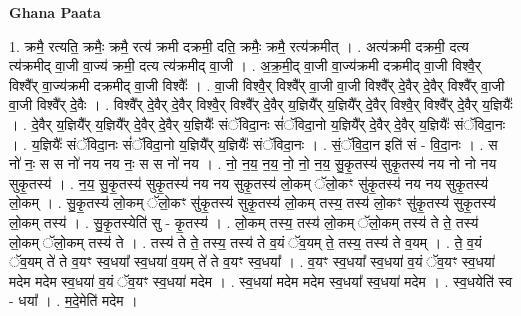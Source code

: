 \documentclass[17pt]{extarticle}
\begin{document}
\textbf{Ghana Paata } \newline

1. क्रमै॒ रत्यति॒ क्रमैः॒ क्रमै॒ रत्य॑ क्रमी दक्रमी॒ दति॒ क्रमैः॒ क्रमै॒ रत्य॑क्रमीत् । . अत्य॑क्रमी दक्रमी॒ दत्य त्य॑क्रमीद् वा॒जी वा॒ज्य॑ क्रमी॒ दत्य त्य॑क्रमीद् वा॒जी । . अ॒क्र॒मी॒द् वा॒जी वा॒ज्य॑क्रमी दक्रमीद् वा॒जी विश्वै॒र् विश्वै᳚र् वा॒ज्य॑क्रमी दक्रमीद् वा॒जी विश्वैः᳚ । . वा॒जी विश्वै॒र् विश्वै᳚र् वा॒जी वा॒जी विश्वै᳚र् दे॒वैर् दे॒वैर् विश्वै᳚र् वा॒जी वा॒जी विश्वै᳚र् दे॒वैः । . विश्वै᳚र् दे॒वैर् दे॒वैर् विश्वै॒र् विश्वै᳚र् दे॒वैर् य॒ज्ञियै᳚र् य॒ज्ञियै᳚र् दे॒वैर् विश्वै॒र् विश्वै᳚र् दे॒वैर् य॒ज्ञियैः᳚ । . दे॒वैर् य॒ज्ञियै᳚र् य॒ज्ञियै᳚र् दे॒वैर् दे॒वैर् य॒ज्ञियैः᳚ संॅविदा॒नः सं॑ॅविदा॒नो य॒ज्ञियै᳚र् दे॒वैर् दे॒वैर् य॒ज्ञियैः᳚ संॅविदा॒नः । . य॒ज्ञियैः᳚ संॅविदा॒नः सं॑ॅविदा॒नो य॒ज्ञियै᳚र् य॒ज्ञियैः᳚ संॅविदा॒नः । . सं॒ॅवि॒दा॒न इति॑ सं - वि॒दा॒नः । . स नो॑ नः॒ स स नो॑ नय नय नः॒ स स नो॑ नय । . नो॒ न॒य॒ न॒य॒ नो॒ नो॒ न॒य॒ सु॒कृ॒तस्य॑ सुकृ॒तस्य॑ नय नो नो नय सुकृ॒तस्य॑ । . न॒य॒ सु॒कृ॒तस्य॑ सुकृ॒तस्य॑ नय नय सुकृ॒तस्य॑ लो॒कम् ॅलो॒कꣳ सु॑कृ॒तस्य॑ नय नय सुकृ॒तस्य॑ लो॒कम् । . सु॒कृ॒तस्य॑ लो॒कम् ॅलो॒कꣳ सु॑कृ॒तस्य॑ सुकृ॒तस्य॑ लो॒कम् तस्य॒ तस्य॑ लो॒कꣳ सु॑कृ॒तस्य॑ सुकृ॒तस्य॑ लो॒कम् तस्य॑ । . सु॒कृ॒तस्येति॑ सु - कृ॒तस्य॑ । . लो॒कम् तस्य॒ तस्य॑ लो॒कम् ॅलो॒कम् तस्य॑ ते ते॒ तस्य॑ लो॒कम् ॅलो॒कम् तस्य॑ ते । . तस्य॑ ते ते॒ तस्य॒ तस्य॑ ते व॒यं ॅव॒यम् ते॒ तस्य॒ तस्य॑ ते व॒यम् । . ते॒ व॒यं ॅव॒यम् ते॑ ते व॒यꣳ स्व॒धया᳚ स्व॒धया॑ व॒यम् ते॑ ते व॒यꣳ स्व॒धया᳚ । . व॒यꣳ स्व॒धया᳚ स्व॒धया॑ व॒यं ॅव॒यꣳ स्व॒धया॑ मदेम मदेम स्व॒धया॑ व॒यं ॅव॒यꣳ स्व॒धया॑ मदेम । . स्व॒धया॑ मदेम मदेम स्व॒धया᳚ स्व॒धया॑ मदेम । . स्व॒धयेति॑ स्व - धया᳚ । . म॒दे॒मेति॑ मदेम । \newline
\pagebreak
{}
\end{document}
